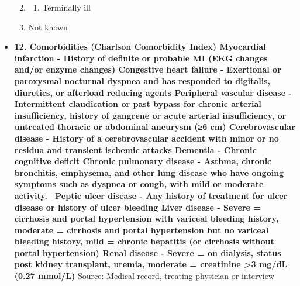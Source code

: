 \documentclass[
]{scrartcl}
\providecommand{\tightlist}{%
  \setlength{\itemsep}{0pt}\setlength{\parskip}{0pt}}\usepackage{longtable,booktabs,array}
\begin{document}
\begin{itemize}
\begin{enumerate}
\begin{enumerate}
    \end{enumerate}
  \item
    \begin{enumerate}
    \def\labelenumii{\arabic{enumii}.}
    \setcounter{enumii}{8}
    \tightlist
    \item
      Terminally ill
    \end{enumerate}
  \item
    Not known
  \end{enumerate}
\item
  \textbf{12. Comorbidities (Charlson Comorbidity Index) Myocardial
  infarction - History of definite or probable MI (EKG changes and/or
  enzyme changes) Congestive heart failure - Exertional or paroxysmal
  nocturnal dyspnea and has responded to digitalis, diuretics, or
  afterload reducing agents Peripheral vascular disease - Intermittent
  claudication or past bypass for chronic arterial insufficiency,
  history of gangrene or acute arterial insufficiency, or untreated
  thoracic or abdominal aneurysm (≥6 cm) Cerebrovascular disease -
  History of a cerebrovascular accident with minor or no residua and
  transient ischemic attacks Dementia - Chronic cognitive deficit
  Chronic pulmonary disease - Asthma, chronic bronchitis, emphysema, and
  other lung disease who have ongoing symptoms such as dyspnea or cough,
  with mild or moderate activity.~ Peptic ulcer disease - Any history of
  treatment for ulcer disease or history of ulcer bleeding Liver disease
  - Severe = cirrhosis and portal hypertension with variceal bleeding
  history, moderate = cirrhosis and portal hypertension but no variceal
  bleeding history, mild = chronic hepatitis (or cirrhosis without
  portal hypertension) Renal disease - Severe = on dialysis, status post
  kidney transplant, uremia, moderate = creatinine \textgreater3 mg/dL
  (0.27 mmol/L)} Source: Medical record, treating physician or interview


\end{itemize}
\end{document}
